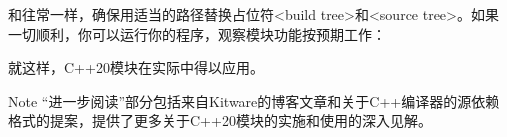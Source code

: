 和往常一样，确保用适当的路径替换占位符<build tree>和<source tree>。如果一切顺利，你可以运行你的程序，观察模块功能按预期工作：


就这样，C++20模块在实际中得以应用。

\begin{myNotic}{Note}
“进一步阅读”部分包括来自Kitware的博客文章和关于C++编译器的源依赖格式的提案，提供了更多关于C++20模块的实施和使用的深入见解。
\end{myNotic}
























